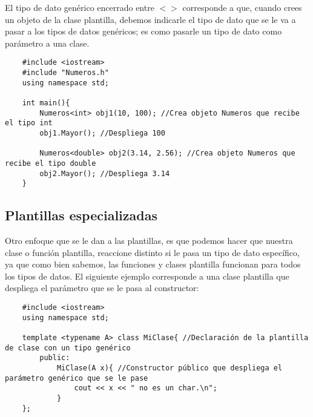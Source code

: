 El tipo de dato genérico encerrado entre $<>$ corresponde a que, cuando crees un objeto de la clase plantilla, debemos indicarle el tipo de dato que se le va a pasar a los tipos de datos genéricos; es como pasarle un tipo de dato como parámetro a una clase.
\begin{lstlisting}
    #include <iostream>
    #include "Numeros.h"
    using namespace std;
    
    int main(){
        Numeros<int> obj1(10, 100); //Crea objeto Numeros que recibe el tipo int
        obj1.Mayor(); //Despliega 100
        
        Numeros<double> obj2(3.14, 2.56); //Crea objeto Numeros que recibe el tipo double
        obj2.Mayor(); //Despliega 3.14
    }
\end{lstlisting}

\subsection{Plantillas especializadas}
\hspace{0.55cm}Otro enfoque que se le dan a las plantillas, es que podemos hacer que nuestra clase o función plantilla, reaccione distinto si le pasa un tipo de dato específico, ya que como bien sabemos, las funciones y clases plantilla funcionan para todos los tipos de datos. El siguiente ejemplo corresponde a una clase plantilla que despliega el parámetro que se le pasa al constructor:
\begin{lstlisting}
    #include <iostream>
    using namespace std;
    
    template <typename A> class MiClase{ //Declaración de la plantilla de clase con un tipo genérico
        public:
            MiClase(A x){ //Constructor público que despliega el parámetro genérico que se le pase
                cout << x << " no es un char.\n";
            }
    };
\end{lstlisting}

